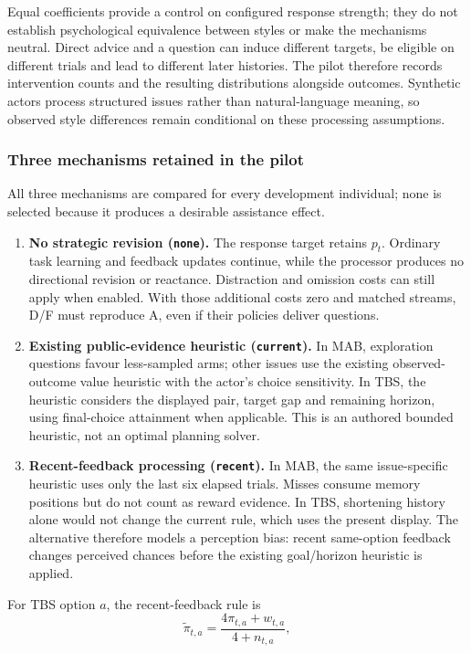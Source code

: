 \documentclass[11pt,a4paper]{article}
\begin{document}
Equal coefficients provide a control on configured response strength; they do not establish psychological equivalence between styles or make the mechanisms neutral. Direct advice and a question can induce different targets, be eligible on different trials and lead to different later histories. The pilot therefore records intervention counts and the resulting distributions alongside outcomes. Synthetic actors process structured issues rather than natural-language meaning, so observed style differences remain conditional on these processing assumptions.

\subsubsection{Three mechanisms retained in the pilot}
All three mechanisms are compared for every development individual; none is selected because it produces a desirable assistance effect.
\begin{enumerate}
  \item \textbf{No strategic revision (\texttt{none}).} The response target retains $p_t$. Ordinary task learning and feedback updates continue, while the processor produces no directional revision or reactance. Distraction and omission costs can still apply when enabled. With those additional costs zero and matched streams, D/F must reproduce A, even if their policies deliver questions.
  \item \textbf{Existing public-evidence heuristic (\texttt{current}).} In MAB, exploration questions favour less-sampled arms; other issues use the existing observed-outcome value heuristic with the actor's choice sensitivity. In TBS, the heuristic considers the displayed pair, target gap and remaining horizon, using final-choice attainment when applicable. This is an authored bounded heuristic, not an optimal planning solver.
  \item \textbf{Recent-feedback processing (\texttt{recent}).} In MAB, the same issue-specific heuristic uses only the last six elapsed trials. Misses consume memory positions but do not count as reward evidence. In TBS, shortening history alone would not change the current rule, which uses the present display. The alternative therefore models a perception bias: recent same-option feedback changes perceived chances before the existing goal/horizon heuristic is applied.
\end{enumerate}
For TBS option $a$, the recent-feedback rule is
\begin{equation}
 \widetilde{\pi}_{t,a}=\frac{4\pi_{t,a}+w_{t,a}}{4+n_{t,a}},
\end{equation}
\end{document}

